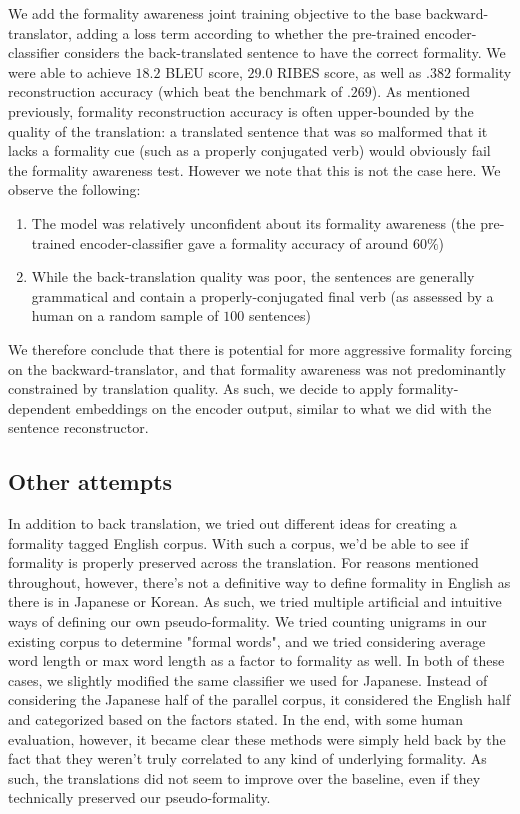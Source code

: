 \documentclass[11pt]{article}
\begin{document}
We add the formality awareness joint training objective to the base backward-translator, adding a loss term according to whether the pre-trained encoder-classifier considers the back-translated sentence to have the correct formality. We were able to achieve $18.2$ BLEU score, $29.0$ RIBES score, as well as $.382$ formality reconstruction accuracy (which beat the benchmark of $.269$). As mentioned previously, formality reconstruction accuracy is often upper-bounded by the quality of the translation: a translated sentence that was so malformed that it lacks a formality cue (such as a properly conjugated verb) would obviously fail the formality awareness test. However we note that this is not the case here. We observe the following:

\begin{enumerate}[label=\arabic*]
    \item The model was relatively unconfident about its formality awareness (the pre-trained encoder-classifier gave a formality accuracy of around $60\%$)
    \item While the back-translation quality was poor, the sentences are generally grammatical and contain a properly-conjugated final verb (as assessed by a human on a random sample of $100$ sentences)
\end{enumerate}

We therefore conclude that there is potential for more aggressive formality forcing on the backward-translator, and that formality awareness was not predominantly constrained by translation quality. As such, we decide to apply formality-dependent embeddings on the encoder output, similar to what we did with the sentence reconstructor.

\subsection{Other attempts}
In addition to back translation, we tried out different ideas for creating a formality tagged English corpus. With such a corpus, we'd be able to see if formality is properly preserved across the translation. For reasons mentioned throughout, however, there's not a definitive way to define formality in English as there is in Japanese or Korean. As such, we tried multiple artificial and intuitive ways of defining our own pseudo-formality. We tried counting unigrams in our existing corpus to determine "formal words", and we tried considering average word length or max word length as a factor to formality as well. In both of these cases, we slightly modified the same classifier we used for Japanese. Instead of considering the Japanese half of the parallel corpus, it considered the English half and categorized based on the factors stated. In the end, with some human evaluation, however, it became clear these methods were simply held back by the fact that they weren't truly correlated to any kind of underlying formality. As such, the translations did not seem to improve over the baseline, even if they technically preserved our pseudo-formality.
\end{document}
